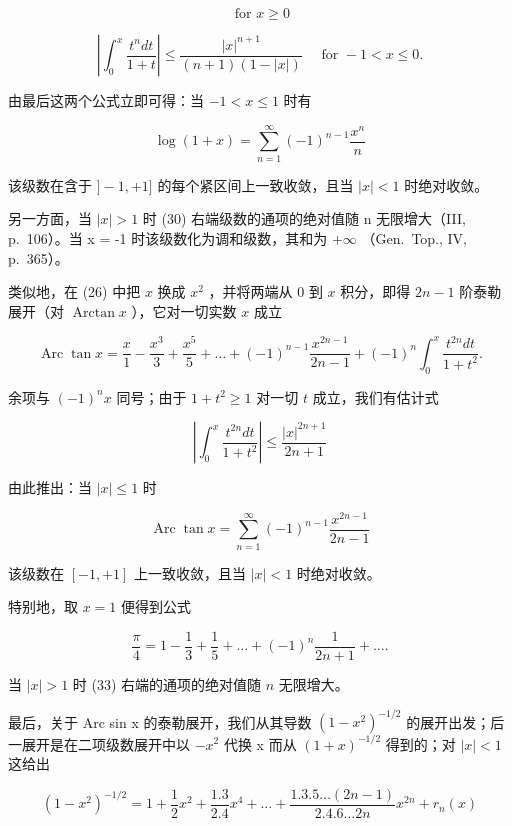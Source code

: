 \[
\text { for } x \geqslant 0\tag{28}
\]

\[
\left| \int_ {0} ^ {x} \frac {t ^ {n} d t}{1 + t} \right| \leqslant \frac {| x | ^ {n + 1}}{(n + 1) (1 - | x |)} \quad \text {   for   } - 1 <   x \leqslant 0.\tag{29}
\]

由最后这两个公式立即可得：当 \(-1 < x \leqslant 1\) 时有

\[
\log (1 + x) = \sum_ {n = 1} ^ {\infty} (- 1) ^ {n - 1} \frac {x ^ {n}}{n}\tag{30}
\]

该级数在含于 \(]-1,+1]\) 的每个紧区间上一致收敛，且当 \(|x|<1\) 时绝对收敛。

另一方面，当 \(|x| > 1\) 时 (30) 右端级数的通项的绝对值随 n 无限增大（III, p.~106）。当 x = -1 时该级数化为调和级数，其和为 \(+\infty\) （Gen.~Top., IV, p.~365）。

类似地，在 (26) 中把 \(x\) 换成 \(x^2\) ，并将两端从 0 到 \(x\) 积分，即得 \(2n - 1\) 阶泰勒展开（对 \(\operatorname{Arctan} x\) ），它对一切实数 \(x\) 成立

\[
\operatorname{Arc} \tan x = \frac {x}{1} - \frac {x ^ {3}}{3} + \frac {x ^ {5}}{5} + \dots + (- 1) ^ {n - 1} \frac {x ^ {2 n - 1}}{2 n - 1} + (- 1) ^ {n} \int_ {0} ^ {x} \frac {t ^ {2 n} d t}{1 + t ^ {2}}.\tag{31}
\]

余项与 \((-1)^n x\) 同号；由于 \(1 + t^2 \geqslant 1\) 对一切 \(t\) 成立，我们有估计式

\[
\left| \int_ {0} ^ {x} \frac {t ^ {2 n} d t}{1 + t ^ {2}} \right| \leqslant \frac {| x | ^ {2 n + 1}}{2 n + 1}\tag{32}
\]

由此推出：当 \(|x| \leqslant 1\) 时

\[
\operatorname{Arc} \tan x = \sum_ {n = 1} ^ {\infty} (- 1) ^ {n - 1} \frac {x ^ {2 n - 1}}{2 n - 1}\tag{33}
\]

该级数在 \([-1,+1]\) 上一致收敛，且当 \(|x|<1\) 时绝对收敛。

特别地，取 \(x = 1\) 便得到公式

\[
{\frac {\pi}{4}} = 1 - {\frac {1}{3}} + {\frac {1}{5}} + \dots + (- 1) ^ {n} {\frac {1}{2 n + 1}} + \dots .\tag{34}
\]

当 \(|x| > 1\) 时 (33) 右端的通项的绝对值随 \(n\) 无限增大。

最后，关于 Arc sin x 的泰勒展开，我们从其导数 \((1 - x^{2})^{-1/2}\) 的展开出发；后一展开是在二项级数展开中以 \(-x^{2}\) 代换 x 而从 \((1 + x)^{-1/2}\) 得到的；对 \(|x| < 1\) 这给出

\[
(1 - x ^ {2}) ^ {- 1 / 2} = 1 + \frac {1}{2} x ^ {2} + \frac {1 . 3}{2 . 4} x ^ {4} + \dots + \frac {1 . 3 . 5 \dots (2 n - 1)}{2 . 4 . 6 \dots 2 n} x ^ {2 n} + r _ {n} (x)
\]

